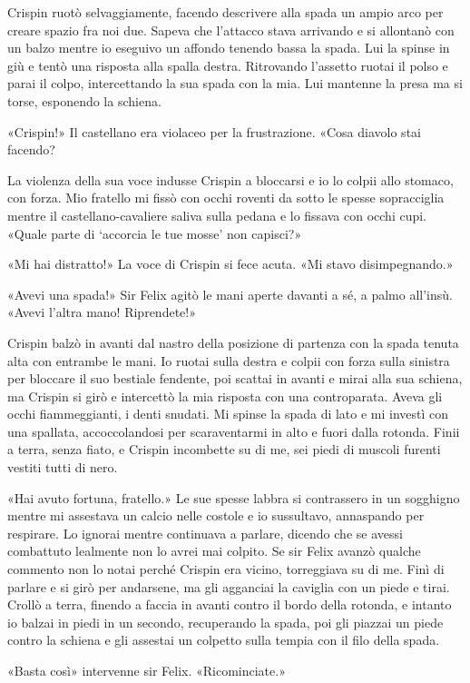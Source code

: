 Crispin ruotò selvaggiamente, facendo descrivere alla spada un ampio
arco per creare spazio fra noi due. Sapeva che l'attacco stava arrivando
e si allontanò con un balzo mentre io eseguivo un affondo tenendo bassa
la spada. Lui la spinse in giù e tentò una risposta alla spalla destra.
Ritrovando l'assetto ruotai il polso e parai il colpo, intercettando la
sua spada con la mia. Lui mantenne la presa ma si torse, esponendo la
schiena.

«Crispin!» Il castellano era violaceo per la frustrazione. «Cosa diavolo
stai facendo?

La violenza della sua voce indusse Crispin a bloccarsi e io lo colpii
allo stomaco, con forza. Mio fratello mi fissò con occhi roventi da
sotto le spesse sopracciglia mentre il castellano-cavaliere saliva sulla
pedana e lo fissava con occhi cupi. «Quale parte di `accorcia le tue
mosse' non capisci?»

«Mi hai distratto!» La voce di Crispin si fece acuta. «Mi stavo
disimpegnando.»

«Avevi una spada!» Sir Felix agitò le mani aperte davanti a sé, a palmo
all'insù. «Avevi l'altra mano! Riprendete!»

Crispin balzò in avanti dal nastro della posizione di partenza con la
spada tenuta alta con entrambe le mani. Io ruotai sulla destra e colpii
con forza sulla sinistra per bloccare il suo bestiale fendente, poi
scattai in avanti e mirai alla sua schiena, ma Crispin si girò e
intercettò la mia risposta con una controparata. Aveva gli occhi
fiammeggianti, i denti snudati. Mi spinse la spada di lato e mi investì
con una spallata, accoccolandosi per scaraventarmi in alto e fuori dalla
rotonda. Finii a terra, senza fiato, e Crispin incombette su di me, sei
piedi di muscoli furenti vestiti tutti di nero.

«Hai avuto fortuna, fratello.» Le sue spesse labbra si contrassero in un
sogghigno mentre mi assestava un calcio nelle costole e io sussultavo,
annaspando per respirare. Lo ignorai mentre continuava a parlare,
dicendo che se avessi combattuto lealmente non lo avrei mai colpito. Se
sir Felix avanzò qualche commento non lo notai perché Crispin era
vicino, torreggiava su di me. Finì di parlare e si girò per andarsene,
ma gli agganciai la caviglia con un piede e tirai. Crollò a terra,
finendo a faccia in avanti contro il bordo della rotonda, e intanto io
balzai in piedi in un secondo, recuperando la spada, poi gli piazzai un
piede contro la schiena e gli assestai un colpetto sulla tempia con il
filo della spada.

«Basta così» intervenne sir Felix. «Ricominciate.»